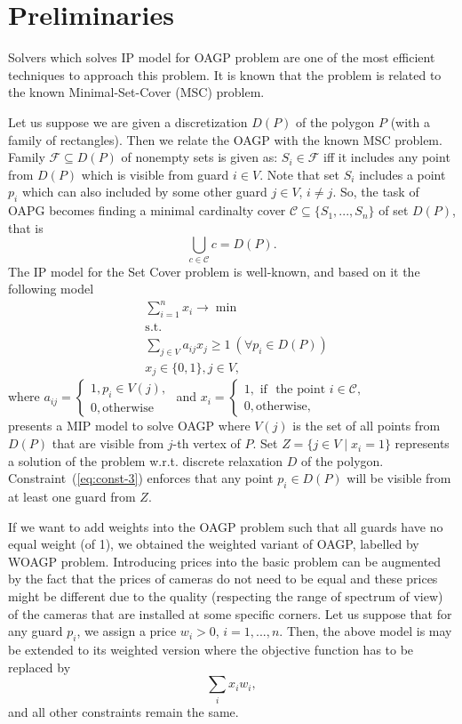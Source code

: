 \documentclass[runningheads,a4paper]{llncs}
\begin{document}
     
     \section{Preliminaries}
     Solvers which solves IP model for OAGP problem are one of the most efficient techniques to approach this problem. It is known that the problem is related to the known Minimal-Set-Cover (MSC) problem.

     Let us suppose we are given a discretization $D(P)$ of the polygon $P$ (with a family of rectangles). Then we relate the OAGP with the known MSC problem.
     Family $\mathcal{F}\subseteq D(P)$ of nonempty sets is given as: $S_i \in \mathcal{F}$ iff it includes any point from $D(P)$ which is visible from guard $i\in V$. Note that set $S_i$ includes a point $p_i$ which can also included by some other guard $j\in V$, $i \neq j$. So, the task of OAPG becomes finding a minimal cardinalty cover $\mathcal{C}\subseteq\{S_1,...,S_n\}$ of set $D(P)$, that is
     $$ \bigcup_{c \in \mathcal{C}} c = D(P).$$ The IP  model for the Set Cover problem is well-known, and based on it the following model
     \begin{align}
        &\sum_{i=1}^n x_i \longrightarrow \min \\
        &\mbox{s.t.} \\
        &\sum_{j\in V} a_{ij}x_j \geq 1\ (\forall p_i\in D(P)) \label{eq:const-3}\\
        & x_j \in \{0,1\}, j \in V,
     \end{align}
     where
     $a_{ij} = \begin{cases}
          1, p_i \in V(j), \\
          0, \mbox{otherwise}
     \end{cases}$
     and $x_i = \begin{cases}
     	 1, \mbox{ if } \mbox{ the point } i \in \mathcal{C},\\
     	 0, \mbox{otherwise},
     \end{cases}$ \\
      presents a MIP model to solve OAGP where $V(j)$ is the set of all points from $D(P)$ that are visible from $j$-th vertex of $P$.
     Set $Z = \{j \in V\mid x_i=1\}$ represents a solution of the problem w.r.t. discrete relaxation $D$ of the polygon.
     Constraint~(\ref{eq:const-3}) enforces that any point $p_i \in D(P)$ will be visible from at least one guard from $Z$.

     If we want to add weights into the OAGP problem such that all guards have no equal weight (of 1), we obtained the weighted variant of OAGP, labelled by WOAGP problem. Introducing prices into the basic problem can be augmented by the fact that the prices of cameras do not need to be equal and these prices might be different due to the quality (respecting the range of spectrum of view) of the cameras that are installed at some specific corners.  Let us suppose that for any guard $p_i$, we assign a price $w_i>0$, $i=1,...,n$. Then, the above model is may be extended to its weighted version where the objective function has to be replaced by
     $$ \sum_{i} x_i w_i,$$
      and all other constraints remain the same.
\end{document}
